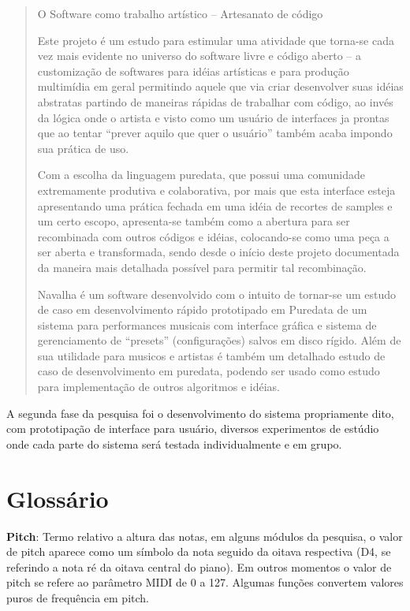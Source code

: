 \documentclass[draft]{ppgmus}
\begin{document}
\begin{quotation}

O Software como trabalho artístico – Artesanato de código 

Este projeto é um estudo para estimular uma atividade que torna-se cada vez mais evidente no universo 
do software livre e código aberto – a customização de softwares para idéias artísticas e para produção 
multimídia em geral permitindo aquele que via criar desenvolver suas idéias abstratas partindo de maneiras 
rápidas de trabalhar com código, ao invés da lógica onde o artista e visto como um usuário de interfaces ja 
prontas que ao tentar “prever aquilo que quer o usuário” também acaba impondo sua prática de uso.

Com a escolha da linguagem puredata, que possui uma comunidade extremamente produtiva e colaborativa,  
por mais que esta interface esteja apresentando uma prática fechada em uma idéia de recortes de samples e um 
certo escopo, apresenta-se também como a abertura para ser recombinada com outros códigos e idéias, colocando-se 
como uma peça a ser aberta e transformada, sendo desde o início deste projeto documentada da maneira mais detalhada 
possível para permitir tal recombinação.

Navalha é um software desenvolvido com o intuito de tornar-se um estudo de caso em desenvolvimento rápido prototipado 
em Puredata de um sistema para performances musicais com interface gráfica e sistema de gerenciamento de “presets” 
(configurações) salvos em disco rígido. Além de sua utilidade para musicos e artistas é também um detalhado estudo 
de caso de desenvolvimento em puredata, podendo ser usado como estudo para implementação de outros algoritmos e idéias.
\end{quotation} 


A segunda fase da pesquisa foi o desenvolvimento do
sistema propriamente dito, com prototipação de interface para usuário,
diversos experimentos de estúdio onde cada parte do sistema será
testada individualmente e em grupo.




\section{Glossário}
\label{glossario}


\textbf{Pitch}: Termo relativo a altura das notas, em alguns módulos da pesquisa,
o valor de pitch aparece como um símbolo da nota seguido da oitava respectiva (D4, se
referindo a nota ré da oitava central do piano). Em outros momentos o valor de pitch
se refere ao parâmetro MIDI de 0 a 127. Algumas funções convertem valores puros de frequência
em pitch.
\end{document}
